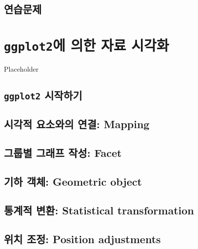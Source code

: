 \documentclass[
]{book}
\begin{document}
\hypertarget{uxc5f0uxc2b5uxbb38uxc81c-2}{%
\section{연습문제}\label{uxc5f0uxc2b5uxbb38uxc81c-2}}

\hypertarget{chapter-ggplot2}{%
\chapter{\texorpdfstring{\texttt{ggplot2}에 의한 자료 시각화}{ggplot2에 의한 자료 시각화}}\label{chapter-ggplot2}}

Placeholder

\hypertarget{ggplot2-uxc2dcuxc791uxd558uxae30}{%
\section{\texorpdfstring{\texttt{ggplot2} 시작하기}{ggplot2 시작하기}}\label{ggplot2-uxc2dcuxc791uxd558uxae30}}

\hypertarget{uxc2dcuxac01uxc801-uxc694uxc18cuxc640uxc758-uxc5f0uxacb0-mapping}{%
\section{시각적 요소와의 연결: Mapping}\label{uxc2dcuxac01uxc801-uxc694uxc18cuxc640uxc758-uxc5f0uxacb0-mapping}}

\hypertarget{uxadf8uxb8f9uxbcc4-uxadf8uxb798uxd504-uxc791uxc131-facet}{%
\section{그룹별 그래프 작성: Facet}\label{uxadf8uxb8f9uxbcc4-uxadf8uxb798uxd504-uxc791uxc131-facet}}

\hypertarget{section-geom}{%
\section{기하 객체: Geometric object}\label{section-geom}}

\hypertarget{uxd1b5uxacc4uxc801-uxbcc0uxd658-statistical-transformation}{%
\section{통계적 변환: Statistical transformation}\label{uxd1b5uxacc4uxc801-uxbcc0uxd658-statistical-transformation}}

\hypertarget{uxc704uxce58-uxc870uxc815-position-adjustments}{%
\section{위치 조정: Position adjustments}\label{uxc704uxce58-uxc870uxc815-position-adjustments}}
\end{document}
